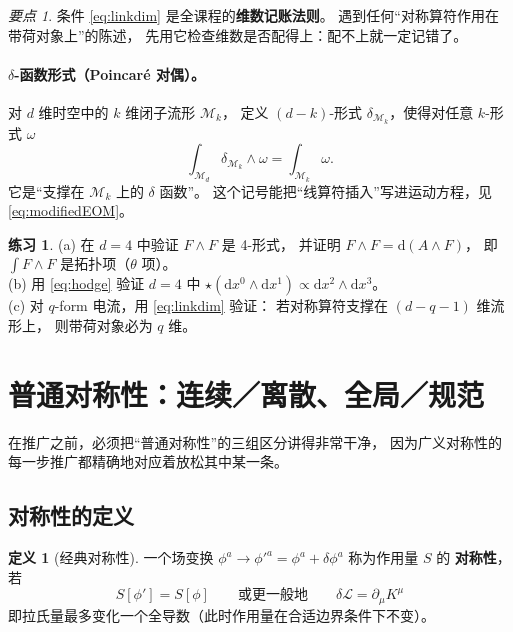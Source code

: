 \documentclass[UTF8,a4paper,11pt]{ctexart}
\theoremstyle{plain}
\theoremstyle{definition}
\newtheorem{definition}{定义}[section]
\newtheorem{exercise}{练习}[section]
\theoremstyle{remark}
\newtheorem{keypoint}{要点}[section]
\newcommand{\ext}{\mathrm{d}}          %
\newcommand{\hs}{\star}                %
\newcommand{\Mfd}{\mathcal{M}}
\newcommand{\Lag}{\mathcal{L}}
\begin{document}
\begin{keypoint}
\label{kp:linkdim}
条件 \eqref{eq:linkdim} 是全课程的\textbf{维数记账法则}。
遇到任何“对称算符作用在带荷对象上”的陈述，
先用它检查维数是否配得上：配不上就一定记错了。
\end{keypoint}

\paragraph{$\delta$-函数形式（Poincaré 对偶）。}
对 $d$ 维时空中的 $k$ 维闭子流形 $\Mfd_k$，
定义 $(d-k)$-形式 $\delta_{\Mfd_k}$，使得对任意 $k$-形式 $\omega$
\begin{equation}
  \int_{\Mfd_d}\delta_{\Mfd_k}\wedge\omega
  =\int_{\Mfd_k}\omega .
  \label{eq:poincare}
\end{equation}
它是“支撑在 $\Mfd_k$ 上的 $\delta$ 函数”。
这个记号能把“线算符插入”写进运动方程，见 \eqref{eq:modifiedEOM}。

\begin{exercise}
\label{ex:forms}
(a) 在 $d=4$ 中验证 $F\wedge F$ 是 4-形式，
并证明 $F\wedge F=\ext(A\wedge F)$，
即 $\int F\wedge F$ 是拓扑项（$\theta$ 项）。\\
(b) 用 \eqref{eq:hodge} 验证 $d=4$ 中
$\hs(\ext x^0\wedge \ext x^1)\propto \ext x^2\wedge \ext x^3$。\\
(c) 对 $q$-form 电流，用 \eqref{eq:linkdim} 验证：
若对称算符支撑在 $(d-q-1)$ 维流形上，
则带荷对象必为 $q$ 维。
\end{exercise}

\section{普通对称性：连续／离散、全局／规范}
\label{sec:ordinary}

在推广之前，必须把“普通对称性”的三组区分讲得非常干净，
因为广义对称性的每一步推广都精确地对应着放松其中某一条。

\subsection{对称性的定义}

\begin{definition}[经典对称性]
一个场变换 $\phi^a\to\phi'^a=\phi^a+\delta\phi^a$ 称为作用量 $S$ 的
\textbf{对称性}，若
\begin{equation}
  S[\phi']=S[\phi]
  \qquad\text{或更一般地}\qquad
  \delta\Lag=\partial_\mu K^\mu
  \label{eq:symdef}
\end{equation}
即拉氏量最多变化一个全导数（此时作用量在合适边界条件下不变）。
\end{definition}
\end{document}

